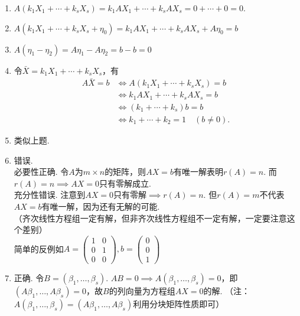 \begin{enumerate}
\begin{enumerate}
              \item $A(k_1X_1+\cdots+k_sX_s)=k_1AX_1+\cdots+k_sAX_s=0+\cdots+0=0$.

              \item $A(k_1X_1+\cdots+k_sX_s+\eta_0)=k_1AX_1+\cdots+k_sAX_s+A\eta_0=b$

              \item $A(\eta_1-\eta_2)=A\eta_1-A\eta_2=b-b=0$

              \item 令$\bar{X}=k_1X_1+\cdots+k_sX_s$，有
                    \begin{align*}
                        A\bar{X}=b & \iff A(k_1X_1+\cdots+k_sX_s)=b        \\
                                   & \iff k_1AX_1+\cdots+k_sAX_s=b         \\
                                   & \iff (k_1+\cdots+k_s)b=b              \\
                                   & \iff k_1+\cdots+k_2=1\quad (b\neq 0).
                    \end{align*}

              \item 类似上题.

              \item 错误.\\
                    必要性正确. 令$A$为$m\times n$的矩阵，则$AX=b$有唯一解表明$r(A)=n$. 而$r(A)=n\implies AX=0$只有零解成立.\\
                    充分性错误. 注意到$AX=0$只有零解$\implies r(A)=n$. 但$r(A)=m$不代表$AX=b$有唯一解，因为还有无解的可能.\\
                    （齐次线性方程组一定有解，但非齐次线性方程组不一定有解，一定要注意这个差别）\\
                    简单的反例如$A=\begin{pmatrix}
                            1 & 0 \\
                            0 & 1 \\
                            0 & 0
                        \end{pmatrix},b=\begin{pmatrix}
                            0 \\
                            0 \\
                            1
                        \end{pmatrix}$

              \item 正确. 令$B=(\beta_1,\ldots,\beta_s)$. $AB=0\implies A(\beta_1,\ldots,\beta_s)=0$，即$(A\beta_1, \ldots, A\beta_s)=0$，故$B$的列向量为方程组$AX=0$的解. （注：$A(\beta_1,\ldots,\beta_s)=(A\beta_1, \ldots, A\beta_s)$利用分块矩阵性质即可）


\end{enumerate}
\end{enumerate}
